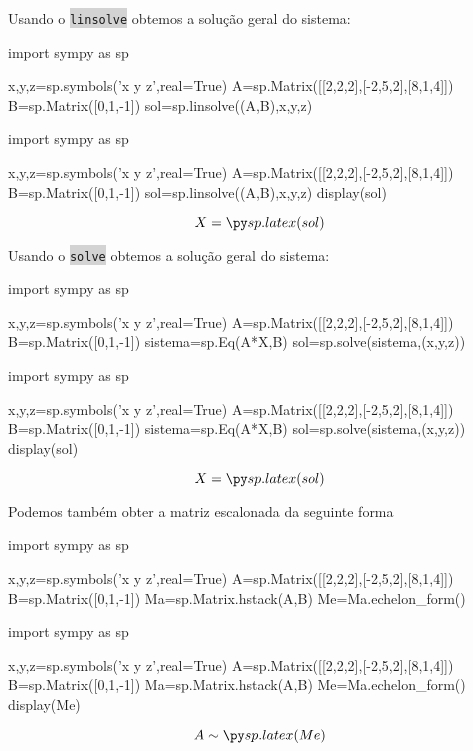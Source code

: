 \begin{frame}[label=sistemas,fragile=singleslide]{}
Usando o {\colorbox{lightgray}{\texttt{linsolve}}} obtemos a solução geral do sistema:
\begin{pycode}
import sympy as sp

x,y,z=sp.symbols('x y z',real=True)
A=sp.Matrix([[2,2,2],[-2,5,2],[8,1,4]])
B=sp.Matrix([0,1,-1])
sol=sp.linsolve((A,B),x,y,z)
\end{pycode}

\begin{footnotesize}
\begin{pyverbatim}
import sympy as sp

x,y,z=sp.symbols('x y z',real=True)
A=sp.Matrix([[2,2,2],[-2,5,2],[8,1,4]])
B=sp.Matrix([0,1,-1])
sol=sp.linsolve((A,B),x,y,z)
display(sol)
\end{pyverbatim}
\end{footnotesize}

\[X=\pyl{sol}\]
\end{frame}


\begin{frame}[label=sistemas,fragile=singleslide]{}
Usando o {\colorbox{lightgray}{\texttt{solve}}} obtemos a solução geral do sistema:
\begin{pycode}
import sympy as sp

x,y,z=sp.symbols('x y z',real=True)
A=sp.Matrix([[2,2,2],[-2,5,2],[8,1,4]])
B=sp.Matrix([0,1,-1])
sistema=sp.Eq(A*X,B)
sol=sp.solve(sistema,(x,y,z))
\end{pycode}

\begin{footnotesize}
\begin{pyverbatim}
import sympy as sp

x,y,z=sp.symbols('x y z',real=True)
A=sp.Matrix([[2,2,2],[-2,5,2],[8,1,4]])
B=sp.Matrix([0,1,-1])
sistema=sp.Eq(A*X,B)
sol=sp.solve(sistema,(x,y,z))
display(sol)
\end{pyverbatim}
\end{footnotesize}

\[X=\pyl{sol}\]
\end{frame}

\begin{frame}[label=sistemas,fragile=singleslide]{}
Podemos também obter a {\color{blue}matriz escalonada} da seguinte forma
\begin{pycode}
import sympy as sp

x,y,z=sp.symbols('x y z',real=True)
A=sp.Matrix([[2,2,2],[-2,5,2],[8,1,4]])
B=sp.Matrix([0,1,-1])
Ma=sp.Matrix.hstack(A,B)
Me=Ma.echelon_form()
\end{pycode}

\begin{footnotesize}
\begin{pyverbatim}
import sympy as sp

x,y,z=sp.symbols('x y z',real=True)
A=sp.Matrix([[2,2,2],[-2,5,2],[8,1,4]])
B=sp.Matrix([0,1,-1])
Ma=sp.Matrix.hstack(A,B)
Me=Ma.echelon_form()
display(Me)
\end{pyverbatim}
\end{footnotesize}

\[A \sim \pyl{Me}\]
\end{frame}


